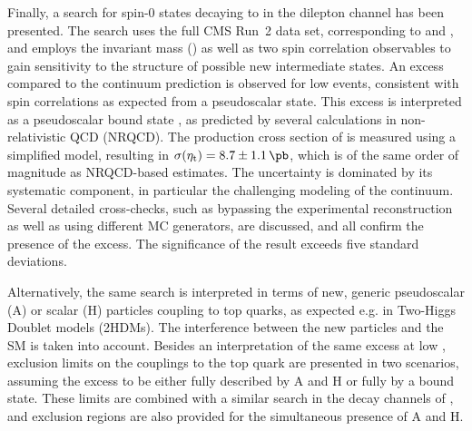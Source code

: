 
\smallskip

Finally, a search for spin-0 states decaying to \ttbar in the dilepton channel has been presented. The search uses the full CMS Run~2 data set, corresponding to \lumiRII and \sqrtsRII, and employs the invariant \ttbar mass (\mtt) as well as two \ttbar spin correlation observables to gain sensitivity to the \CP structure of possible new intermediate states. An excess compared to the \ttbar continuum prediction is observed for low \mtt events, consistent with spin correlations as expected from a pseudoscalar state. This excess is interpreted as a pseudoscalar \ttbar bound state \etat, as predicted by several calculations in non-relativistic QCD (NRQCD). The production cross section of \etat is measured using a simplified \etat model, resulting in $\sigetat = 8.7 \pm 1.1  \, \si{\pb}$, which is of the same order of magnitude as NRQCD-based estimates. The uncertainty is dominated by its systematic component, in particular the challenging modeling of the \ttbar continuum. Several detailed cross-checks, such as bypassing the experimental \ttbar reconstruction as well as using different MC generators, are discussed, and all confirm the presence of the excess. The significance of the result exceeds five standard deviations.%

Alternatively, the same search is interpreted in terms of new, generic pseudoscalar (A) or scalar (H) particles coupling to top quarks, as expected e.g. in Two-Higgs Doublet models (2HDMs). The interference between the new particles and the SM is taken into account. %
Besides an interpretation of the same excess at low \mtt, exclusion limits on the couplings to the top quark are presented in two scenarios, assuming the excess to be either fully described by A and H or fully by a \ttbar bound state. These limits are combined with a similar search in the \ljets decay channels of \ttbar, and exclusion regions are also provided for the simultaneous presence of A and H.

